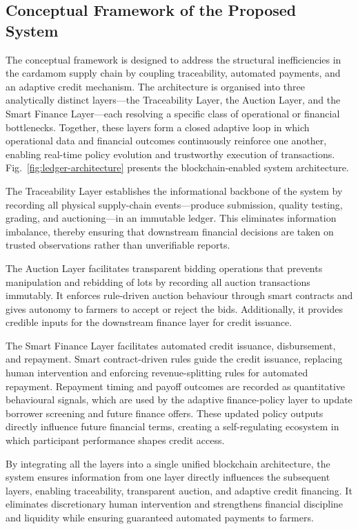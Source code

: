 \documentclass[12pt]{article}
\begin{document}
	
	
	\subsection{Conceptual Framework of the Proposed System}
	
	
	
	
	The conceptual framework is designed to address the structural inefficiencies in the cardamom supply chain by coupling traceability, automated payments, and an adaptive credit mechanism. The architecture is organised into three analytically distinct layers---the 
	Traceability Layer, the Auction Layer, and the Smart Finance Layer---each resolving a specific class of operational or financial bottlenecks. Together, these layers form a closed adaptive loop in which operational data and financial outcomes continuously reinforce one another, enabling real-time policy evolution and trustworthy execution of transactions. Fig.~\ref{fig:ledger-architecture} presents the blockchain-enabled system architecture.
	
	The Traceability Layer establishes the informational backbone of the system by recording all physical supply-chain events---produce submission, quality testing, grading, and auctioning---in an immutable ledger. This eliminates information imbalance, thereby ensuring that downstream financial decisions are taken on trusted observations rather than unverifiable reports. 
	
	The Auction Layer facilitates transparent bidding operations that prevents manipulation and rebidding of lots by recording all auction transactions immutably. It enforces rule-driven auction behaviour through smart contracts and gives autonomy to farmers to accept or reject the bids. Additionally, it provides credible inputs for the downstream finance layer for credit issuance.
	
	The Smart Finance Layer facilitates automated credit issuance, disbursement, and repayment. Smart contract-driven rules guide the credit issuance, replacing human intervention and enforcing revenue-splitting rules for automated repayment. Repayment timing and payoff outcomes are recorded as quantitative behavioural signals, which are used by the adaptive finance-policy layer to update borrower screening and future finance offers. These updated policy outputs directly influence future financial terms, creating a self-regulating ecosystem in which participant performance shapes credit access.
	
	By integrating all the layers into a single unified blockchain architecture, the system ensures information from one layer directly influences the subsequent layers, enabling traceability, transparent auction, and adaptive credit financing. It eliminates discretionary human intervention and strengthens financial discipline and liquidity while ensuring guaranteed automated payments to farmers.
	
\end{document}
